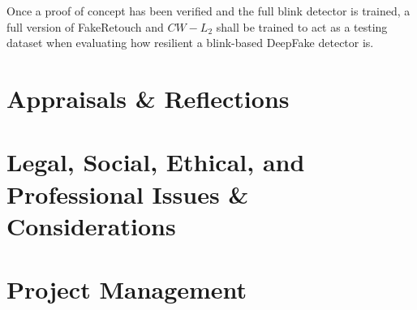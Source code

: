 \documentclass{article}
\begin{document}
Once a proof of concept has been verified and the full blink detector is trained, a full version of FakeRetouch and $CW-L_2$ shall be trained to act as a testing dataset when evaluating how resilient a blink-based DeepFake detector is.

\section{Appraisals \& Reflections}

\section{Legal, Social, Ethical, and Professional Issues \& Considerations}

\section{Project Management}



\end{document}
